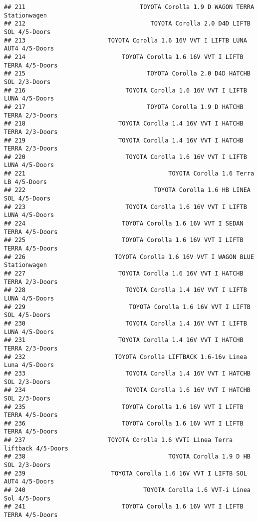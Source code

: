 \documentclass[]{article}
\begin{document}
\begin{verbatim}
## 211                                TOYOTA Corolla 1.9 D WAGON TERRA Stationwagen
## 212                                   TOYOTA Corolla 2.0 D4D LIFTB SOL 4/5-Doors
## 213                       TOYOTA Corolla 1.6 16V VVT I LIFTB LUNA AUT4 4/5-Doors
## 214                           TOYOTA Corolla 1.6 16V VVT I LIFTB TERRA 4/5-Doors
## 215                                  TOYOTA Corolla 2.0 D4D HATCHB SOL 2/3-Doors
## 216                            TOYOTA Corolla 1.6 16V VVT I LIFTB LUNA 4/5-Doors
## 217                                  TOYOTA Corolla 1.9 D HATCHB TERRA 2/3-Doors
## 218                          TOYOTA Corolla 1.4 16V VVT I HATCHB TERRA 2/3-Doors
## 219                          TOYOTA Corolla 1.4 16V VVT I HATCHB TERRA 2/3-Doors
## 220                            TOYOTA Corolla 1.6 16V VVT I LIFTB LUNA 4/5-Doors
## 221                                        TOYOTA Corolla 1.6 Terra LB 4/5-Doors
## 222                                    TOYOTA Corolla 1.6 HB LINEA SOL 4/5-Doors
## 223                            TOYOTA Corolla 1.6 16V VVT I LIFTB LUNA 4/5-Doors
## 224                           TOYOTA Corolla 1.6 16V VVT I SEDAN TERRA 4/5-Doors
## 225                           TOYOTA Corolla 1.6 16V VVT I LIFTB TERRA 4/5-Doors
## 226                         TOYOTA Corolla 1.6 16V VVT I WAGON BLUE Stationwagen
## 227                          TOYOTA Corolla 1.6 16V VVT I HATCHB TERRA 2/3-Doors
## 228                            TOYOTA Corolla 1.4 16V VVT I LIFTB LUNA 4/5-Doors
## 229                             TOYOTA Corolla 1.6 16V VVT I LIFTB SOL 4/5-Doors
## 230                            TOYOTA Corolla 1.4 16V VVT I LIFTB LUNA 4/5-Doors
## 231                          TOYOTA Corolla 1.4 16V VVT I HATCHB TERRA 2/3-Doors
## 232                         TOYOTA Corolla LIFTBACK 1.6-16v Linea Luna 4/5-Doors
## 233                            TOYOTA Corolla 1.4 16V VVT I HATCHB SOL 2/3-Doors
## 234                            TOYOTA Corolla 1.6 16V VVT I HATCHB SOL 2/3-Doors
## 235                           TOYOTA Corolla 1.6 16V VVT I LIFTB TERRA 4/5-Doors
## 236                           TOYOTA Corolla 1.6 16V VVT I LIFTB TERRA 4/5-Doors
## 237                       TOYOTA Corolla 1.6 VVTI Linea Terra liftback 4/5-Doors
## 238                                        TOYOTA Corolla 1.9 D HB SOL 2/3-Doors
## 239                        TOYOTA Corolla 1.6 16V VVT I LIFTB SOL AUT4 4/5-Doors
## 240                                 TOYOTA Corolla 1.6 VVT-i Linea Sol 4/5-Doors
## 241                           TOYOTA Corolla 1.6 16V VVT I LIFTB TERRA 4/5-Doors

\end{verbatim}
\end{document}
